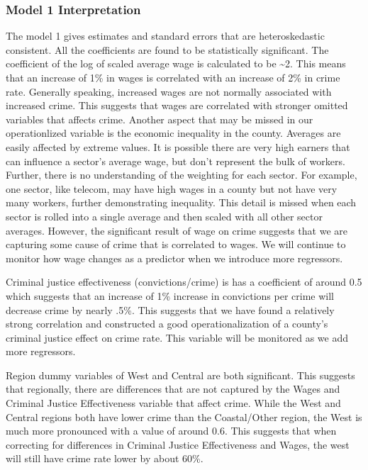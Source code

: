 \documentclass[]{article}
\begin{document}
\hypertarget{model-1-interpretation}{%
\subsubsection{Model 1 Interpretation}\label{model-1-interpretation}}

The model 1 gives estimates and standard errors that are heteroskedastic
consistent. All the coefficients are found to be statistically
significant. The coefficient of the log of scaled average wage is
calculated to be \textasciitilde{}2. This means that an increase of 1\%
in wages is correlated with an increase of 2\% in crime rate. Generally
speaking, increased wages are not normally associated with increased
crime. This suggests that wages are correlated with stronger omitted
variables that affects crime. Another aspect that may be missed in our
operationlized variable is the economic inequality in the county.
Averages are easily affected by extreme values. It is possible there are
very high earners that can influence a sector's average wage, but don't
represent the bulk of workers. Further, there is no understanding of the
weighting for each sector. For example, one sector, like telecom, may
have high wages in a county but not have very many workers, further
demonstrating inequality. This detail is missed when each sector is
rolled into a single average and then scaled with all other sector
averages. However, the significant result of wage on crime suggests that
we are capturing some cause of crime that is correlated to wages. We
will continue to monitor how wage changes as a predictor when we
introduce more regressors.

Criminal justice effectiveness (convictions/crime) is has a coefficient
of around 0.5 which suggests that an increase of 1\% increase in
convictions per crime will decrease crime by nearly .5\%. This suggests
that we have found a relatively strong correlation and constructed a
good operationalization of a county's criminal justice effect on crime
rate. This variable will be monitored as we add more regressors.

Region dummy variables of West and Central are both significant. This
suggests that regionally, there are differences that are not captured by
the Wages and Criminal Justice Effectiveness variable that affect crime.
While the West and Central regions both have lower crime than the
Coastal/Other region, the West is much more pronounced with a value of
around 0.6. This suggests that when correcting for differences in
Criminal Justice Effectiveness and Wages, the west will still have crime
rate lower by about 60\%.
\end{document}
